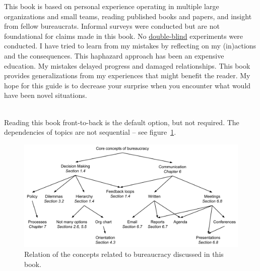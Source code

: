 This book is based on personal experience operating in multiple large organizations and small teams, reading published books and papers, and insight from fellow bureaucrats. Informal surveys were conducted but are not foundational for claims made in this book.%
\iftoggle{WPinmargin}{\marginpar{$>$Wikipedia: blinded-experiment}}{}
No \href{https://en.wikipedia.org/wiki/Blinded_experiment}{double-blind}%
experiments were conducted. 
I have tried to learn from my mistakes by reflecting on my (in)actions and the consequences. This haphazard approach has been an expensive education. My mistakes delayed progress and damaged relationships. This book  provides generalizations from my experiences that might benefit the reader. My hope for this guide is to decrease your surprise when you encounter what would have been novel situations.

\ \\

Reading this book front-to-back is the default option, but not required. The dependencies of topics are not sequential -- see figure~\ref{fig:core-concepts}.

\begin{figure}[ht]
    \centering
    \includegraphics[width=1\textwidth]{images/core_concepts_map.pdf}
    \caption{Relation of the concepts related to bureaucracy discussed in this book.}
    \label{fig:core-concepts}
\end{figure}


